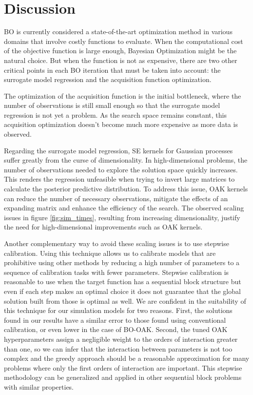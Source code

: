 \documentclass{IOS-Book-Article}
\begin{document}
\section{Discussion}
BO is currently considered a state-of-the-art optimization method in various domains that involve costly functions to evaluate. When the computational cost of the objective function is large enough, Bayesian Optimization might be the natural choice. But when the function is not as expensive, there are two other critical points in each BO iteration that must be taken into account: the surrogate model regression and the acquisition function optimization.
	
The optimization of the acquisition function is the initial bottleneck, where the number of observations is still small enough so that the surrogate model regression is not yet a problem. As the search space remains constant, this acquisition optimization doesn't become much more expensive as more data is observed.
	
Regarding the surrogate model regression, SE kernels for Gaussian processes suffer greatly from the curse of dimensionality. In high-dimensional problems, the number of observations needed to explore the solution space quickly increases. This renders the regression unfeasible when trying to invert large matrices to calculate the posterior predictive distribution. To address this issue, OAK kernels can reduce the number of necessary observations, mitigate the effects of an expanding matrix and enhance the efficiency of the search. The observed scaling issues in figure \ref{fig:sim_times}, resulting from increasing dimensionality, justify the need for high-dimensional improvements such as OAK kernels.
	
Another complementary way to avoid these scaling issues is to use stepwise calibration. Using this technique allows us to calibrate models that are prohibitive using other methods by reducing a high number of parameters to a sequence of calibration tasks with fewer parameters. Stepwise calibration is reasonable to use when the target function has a sequential block structure but even if each step makes an optimal choice it does not guarantee that the global solution built from those is optimal as well. We are confident in the suitability of this technique for our simulation models for two reasons. First, the solutions found in our results have a similar error to those found using conventional calibration, or even lower in the case of BO-OAK. Second, the tuned OAK hyperparameters assign a negligible weight to the orders of interaction greater than one, so we can infer that the interaction between parameters is not too complex and the greedy approach should be a reasonable approximation for many problems where only the first orders of interaction are important\cite{gp-additive}. This stepwise methodology can be generalized and applied in other sequential block problems with similar properties.
	
\end{document}
